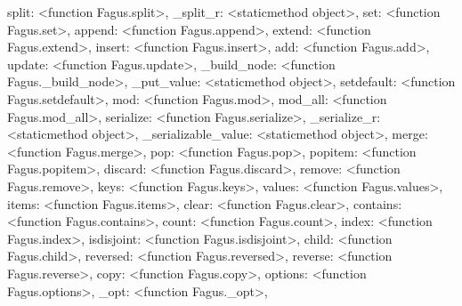\documentclass[a4paper,10pt,english]{sphinxmanual}
\begin{document}
\begin{fulllineitems}
\begin{fulllineitems}
\textquotesingle{}split\textquotesingle{}: \textless{}function Fagus.split\textgreater{}, \textquotesingle{}\_split\_r\textquotesingle{}: \textless{}staticmethod object\textgreater{}, \textquotesingle{}set\textquotesingle{}: \textless{}function Fagus.set\textgreater{}, \textquotesingle{}append\textquotesingle{}: \textless{}function Fagus.append\textgreater{}, \textquotesingle{}extend\textquotesingle{}: \textless{}function Fagus.extend\textgreater{}, \textquotesingle{}insert\textquotesingle{}: \textless{}function Fagus.insert\textgreater{}, \textquotesingle{}add\textquotesingle{}: \textless{}function Fagus.add\textgreater{}, \textquotesingle{}update\textquotesingle{}: \textless{}function Fagus.update\textgreater{}, \textquotesingle{}\_build\_node\textquotesingle{}: \textless{}function Fagus.\_build\_node\textgreater{}, \textquotesingle{}\_put\_value\textquotesingle{}: \textless{}staticmethod object\textgreater{}, \textquotesingle{}setdefault\textquotesingle{}: \textless{}function Fagus.setdefault\textgreater{}, \textquotesingle{}mod\textquotesingle{}: \textless{}function Fagus.mod\textgreater{}, \textquotesingle{}mod\_all\textquotesingle{}: \textless{}function Fagus.mod\_all\textgreater{}, \textquotesingle{}serialize\textquotesingle{}: \textless{}function Fagus.serialize\textgreater{}, \textquotesingle{}\_serialize\_r\textquotesingle{}: \textless{}staticmethod object\textgreater{}, \textquotesingle{}\_serializable\_value\textquotesingle{}: \textless{}staticmethod object\textgreater{}, \textquotesingle{}merge\textquotesingle{}: \textless{}function Fagus.merge\textgreater{}, \textquotesingle{}pop\textquotesingle{}: \textless{}function Fagus.pop\textgreater{}, \textquotesingle{}popitem\textquotesingle{}: \textless{}function Fagus.popitem\textgreater{}, \textquotesingle{}discard\textquotesingle{}: \textless{}function Fagus.discard\textgreater{}, \textquotesingle{}remove\textquotesingle{}: \textless{}function Fagus.remove\textgreater{}, \textquotesingle{}keys\textquotesingle{}: \textless{}function Fagus.keys\textgreater{}, \textquotesingle{}values\textquotesingle{}: \textless{}function Fagus.values\textgreater{}, \textquotesingle{}items\textquotesingle{}: \textless{}function Fagus.items\textgreater{}, \textquotesingle{}clear\textquotesingle{}: \textless{}function Fagus.clear\textgreater{}, \textquotesingle{}contains\textquotesingle{}: \textless{}function Fagus.contains\textgreater{}, \textquotesingle{}count\textquotesingle{}: \textless{}function Fagus.count\textgreater{}, \textquotesingle{}index\textquotesingle{}: \textless{}function Fagus.index\textgreater{}, \textquotesingle{}isdisjoint\textquotesingle{}: \textless{}function Fagus.isdisjoint\textgreater{}, \textquotesingle{}child\textquotesingle{}: \textless{}function Fagus.child\textgreater{}, \textquotesingle{}reversed\textquotesingle{}: \textless{}function Fagus.reversed\textgreater{}, \textquotesingle{}reverse\textquotesingle{}: \textless{}function Fagus.reverse\textgreater{}, \textquotesingle{}copy\textquotesingle{}: \textless{}function Fagus.copy\textgreater{}, \textquotesingle{}options\textquotesingle{}: \textless{}function Fagus.options\textgreater{}, \textquotesingle{}\_opt\textquotesingle{}: \textless{}function Fagus.\_opt\textgreater{}, 
\end{fulllineitems}
\end{fulllineitems}
\end{document}

